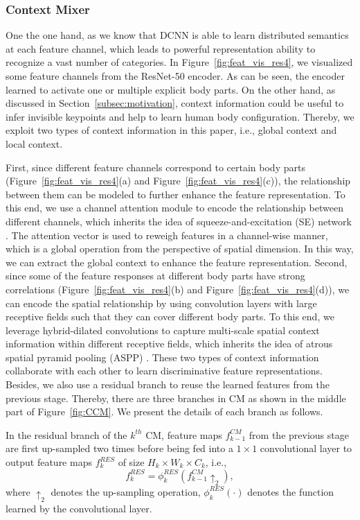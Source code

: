 \documentclass[twocolumn]{svjour3}          \smartqed  \usepackage{natbib}
\begin{document}
\subsubsection{Context Mixer}
\label{subsubsec:CM}
One the one hand, as we know that DCNN is able to learn distributed semantics at each feature channel, which leads to powerful representation ability to recognize a vast number of categories. In Figure~\ref{fig:feat_vis_res4}, we visualized some feature channels from the ResNet-50 encoder. As can be seen, the encoder learned to activate one or multiple explicit body parts. On the other hand, as discussed in Section~\ref{subsec:motivation}, context information could be useful to infer invisible keypoints and help to learn human body configuration. Thereby, we exploit two types of context information in this paper, i.e., global context and local context.

First, since different feature channels correspond to certain body parts (Figure~\ref{fig:feat_vis_res4}(a) and Figure~\ref{fig:feat_vis_res4}(c)), the relationship between them can be modeled to further enhance the feature representation. To this end, we use a channel attention module to encode the relationship between different channels, which inherits the idea of squeeze-and-excitation (SE) network \citep{hu2018squeeze}. The attention vector is used to reweigh features in a channel-wise manner, which is a global operation from the perspective of spatial dimension. In this way, we can extract the global context to enhance the feature representation. Second, since some of the feature responses at different body parts have strong correlations (Figure~\ref{fig:feat_vis_res4}(b) and Figure~\ref{fig:feat_vis_res4}(d)), we can encode the spatial relationship by using convolution layers with large receptive fields such that they can cover different body parts. To this end, we leverage hybrid-dilated convolutions to capture multi-scale spatial context information within different receptive fields, which inherits the idea of atrous spatial pyramid pooling (ASPP) \citep{chen2018deeplab}. These two types of context information collaborate with each other to learn discriminative feature representations. Besides, we also use a residual branch to reuse the learned features from the previous stage. Thereby, there are three branches in CM as shown in the middle part of Figure~\ref{fig:CCM}. We present the details of each branch as follows.

In the residual branch of the $k^{th}$ CM, feature maps $f_{k-1}^{CM}$ from the previous stage are first up-sampled two times before being fed into a $1 \times 1$ convolutional layer to output feature maps $f_k^{RES}$ of size $H_k \times W_k \times C_k$, i.e., 
\begin{equation}
f_k^{RES} = \phi_k^{RES} \left( f_{k-1}^{CM} \uparrow_2 \right),
\label{eq:feat_res}
\end{equation}
where $\uparrow_2$ denotes the up-sampling operation, $\phi_k^{RES}\left(\cdot\right)$ denotes the function learned by the convolutional layer.
\end{document}
